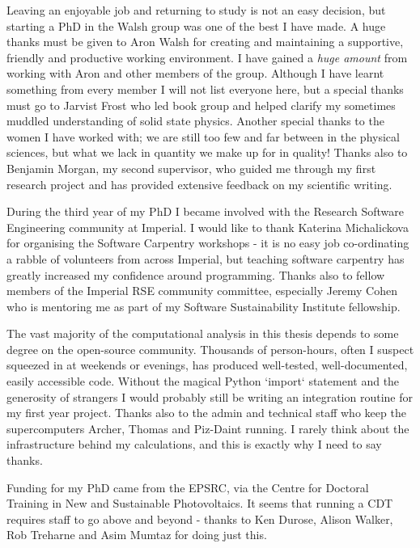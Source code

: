 Leaving an enjoyable job and returning to study is not an easy decision, but starting a PhD in the Walsh group was one of the best I have made. A huge thanks must be given to Aron Walsh for creating and maintaining a supportive, friendly and productive working environment. I have gained a \textit{huge amount} from working with Aron and other members of the group. Although I have learnt something from every member I will not list everyone here, but a special thanks must go to Jarvist Frost who led book group and helped clarify my sometimes muddled understanding of solid state physics. Another special thanks to the women I have worked with; we are still too few and far between in the physical sciences, but what we lack in quantity we make up for in quality! Thanks also to Benjamin Morgan, my second supervisor, who guided me through my first research project and has provided extensive feedback on my scientific writing. 

During the third year of my PhD I became involved with the Research Software Engineering community at Imperial. I would like to thank Katerina Michalickova for organising the Software Carpentry workshops - it is no easy job co-ordinating a rabble of volunteers from across Imperial, but teaching software carpentry has greatly increased my confidence around programming. Thanks also to fellow members of the Imperial RSE community committee, especially Jeremy Cohen who is mentoring me as part of my Software Sustainability Institute fellowship.

The vast majority of the computational analysis in this thesis depends to some degree on the open-source community. Thousands of person-hours, often I suspect squeezed in at weekends or evenings, has produced well-tested, well-documented, easily accessible code. Without the magical Python `import` statement and the generosity of strangers I would probably still be writing an integration routine for my first year project. Thanks also to the admin and technical staff who keep the supercomputers Archer, Thomas and Piz-Daint running. I rarely think about the infrastructure behind my calculations, and this is exactly why I need to say thanks.

Funding for my PhD came from the EPSRC, via the Centre for Doctoral Training in New and Sustainable Photovoltaics. It seems that running a CDT requires staff to go above and beyond - thanks to Ken Durose, Alison Walker, Rob Treharne and Asim Mumtaz for doing just this.

